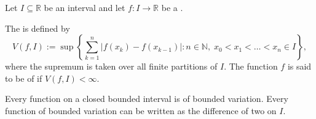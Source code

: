 \begin{definition} \label{definition:function_of_bounded_variation_on_an_interval}
    Let $I \subseteq \mathbb{R}$ be an interval and let $f : I \to \mathbb{R}$ be a .

    The  is defined by
    $$V(f, I) := \sup\left\{ \sum_{k=1}^n |f(x_k) - f(x_{k-1})| : n \in \mathbb{N},\; x_0 < x_1 < \dots < x_n \in I \right\},$$
    where the supremum is taken over all finite partitions of $I$. The function $f$ is said to be of  if $V(f, I) < \infty$.

    Every  function on a closed bounded interval is of bounded variation. Every function of bounded variation can be written as the difference of two  on $I$.
\end{definition}
